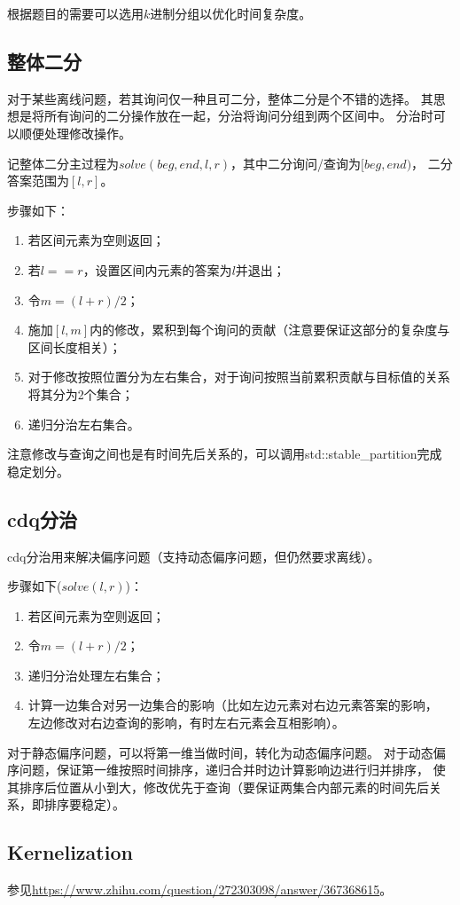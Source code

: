 根据题目的需要可以选用$k$进制分组以优化时间复杂度。
\subsection{整体二分}
对于某些离线问题，若其询问仅一种且可二分，整体二分是个不错的选择。
其思想是将所有询问的二分操作放在一起，分治将询问分组到两个区间中。
分治时可以顺便处理修改操作。

记整体二分主过程为$solve(beg,end,l,r)$，其中二分询问/查询为$[beg,end)$，
二分答案范围为$[l,r]$。

步骤如下：
\begin{enumerate}
	\item 若区间元素为空则返回；
	\item 若$l==r$，设置区间内元素的答案为$l$并退出；
	\item 令$m=(l+r)/2$；
	\item 施加$[l,m]$内的修改，累积到每个询问的贡献（注意要保证这部分的复杂度与
	      区间长度相关）；
	\item 对于修改按照位置分为左右集合，对于询问按照当前累积贡献与目标值的关系
	      将其分为2个集合；
	\item 递归分治左右集合。
\end{enumerate}

注意修改与查询之间也是有时间先后关系的，可以调用std::stable\_partition完成稳定划分。
\subsection{cdq分治}\label{CDQ}
cdq分治用来解决偏序问题（支持动态偏序问题，但仍然要求离线）。

步骤如下($solve(l,r)$)：
\begin{enumerate}
	\item 若区间元素为空则返回；
	\item 令$m=(l+r)/2$；
	\item 递归分治处理左右集合；
	\item 计算一边集合对另一边集合的影响（比如左边元素对右边元素答案的影响，
	      左边修改对右边查询的影响，有时左右元素会互相影响）。
\end{enumerate}

对于静态偏序问题，可以将第一维当做时间，转化为动态偏序问题。
对于动态偏序问题，保证第一维按照时间排序，递归合并时边计算影响边进行归并排序，
使其排序后位置从小到大，修改优先于查询（要保证两集合内部元素的时间先后关系，即排序要稳定）。
\subsection{Kernelization}
参见\url{https://www.zhihu.com/question/272303098/answer/367368615}。
